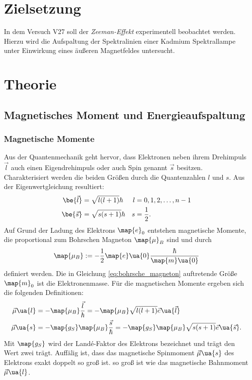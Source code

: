 \setcounter{page}{1}
\section*{Zielsetzung}
In dem Versuch V27 soll der \emph{Zeeman-Effekt} experimentell beobachtet werden. %
Hierzu wird die Aufspaltung der Spektralinien einer Kadmium Spektrallampe %
unter Einwirkung eines äußeren Magnetfeldes untersucht.

\section{Theorie}

\subsection{Magnetisches Moment und Energieaufspaltung}
\subsubsection{Magnetische Momente}
Aus der Quantenmechanik geht hervor, dass Elektronen neben ihrem Drehimpuls $\vec{l}$ auch einen
Eigendrehimpuls oder auch Spin genannt $\vec{s}$ besitzen. Charakterisiert werden die beiden Größen durch die
Quantenzahlen $l$ und $s$. Aus der Eigenwertgleichung resultiert:
\begin{align*}
\be{\vec{l}}&=\sqrt{l(l+1)}\hbar & l&=0,1,2,\dots,n-1\\
\be{\vec{s}}&=\sqrt{s(s+1)}\hbar & s&=\frac{1}{2}.
\end{align*}
Auf Grund der Ladung des Elektrons $\map{e}_0$ entstehen magnetische Momente, die
proportional zum Bohrschen Magneton $\map{\mu}_B$ sind und durch
\begin{equation}
  \label{eq:bohrsche_magneton}
  \map{\mu_B}:=-\frac{1}{2}\map{e}\ua{0} \frac{\hbar}{\map{m}\ua{0}}
\end{equation}
definiert werden. Die in Gleichung \eqref{eq:bohrsche_magneton} auftretende Größe $\map{m}_0$ ist die Elektronenmasse.
Für die magnetischen Momente ergeben sich die folgenden Definitionen:
\begin{align*}
  \vec{\mu}\ua{l}&=-\map{\mu_B}\frac{\vec{l}}{\hbar}=-\map{\mu_B}\sqrt{l(l+1)}\vec{e}\ua{\vec{l}} \\
  \vec{\mu}\ua{s}&=-\map{g_S}\map{\mu_B}\frac{\vec{s}}{\hbar}=-\map{g_S}\map{\mu_B}\sqrt{s(s+1)}\vec{e}\ua{\vec{s}}.
\end{align*}
Mit $\map{g_S}$ wird der Landé-Faktor des Elektrons bezeichnet und trägt den Wert zwei trägt. %
Auffälig ist, dass das magnetische Spinmoment $\vec{\mu}\ua{s}$ des Elektrons exakt doppelt so groß ist. %
so groß ist wie das magnetische Bahnmoment $\vec{\mu}\ua{l}$. %

